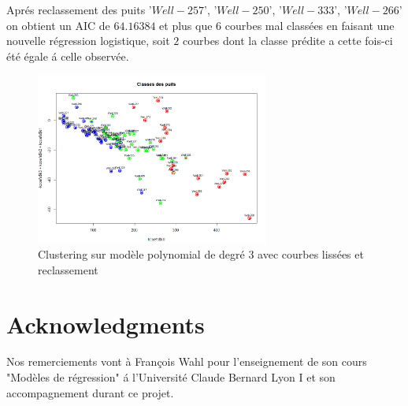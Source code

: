 \documentclass[12pt]{article}
\begin{document}
Apr\'es reclassement des puits  '$Well-257$', '$Well-250$', '$Well-333$', '$Well-266$' on obtient un AIC de $64.16384$ et plus que $6$ courbes mal class\'ees en faisant une nouvelle r\'egression logistique, soit $2$ courbes dont la classe pr\'edite a cette fois-ci \'et\'e \'egale \'a celle observ\'ee.

\begin{figure}[H]
 \centering %
	\includegraphics[width=290px]{cluster_poly_2}
  \caption{\label{fig:reg_exp_clust} Clustering sur mod\`ele polynomial de degr\'e $3$ avec courbes liss\'ees et reclassement}
\end{figure}

\section*{Acknowledgments}
Nos remerciements vont \`a Fran\c cois Wahl pour l'enseignement de son cours "Mod\`eles de r\'egression" \'a l'Universit\'e Claude Bernard Lyon I et son accompagnement durant ce projet.


\appendix
\end{document}
